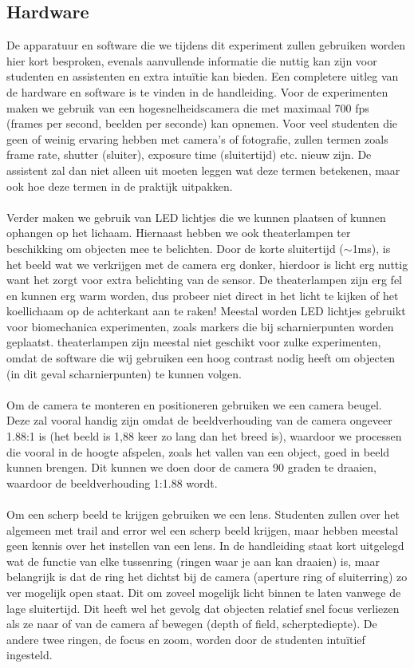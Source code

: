 \documentclass{article}
\begin{document}
\subsection{Hardware}
De apparatuur en software die we tijdens dit experiment zullen gebruiken worden hier kort besproken, evenals aanvullende informatie die nuttig kan zijn voor studenten en assistenten en extra intuïtie kan bieden. Een completere uitleg van de hardware en software is te vinden in de handleiding. Voor de experimenten maken we gebruik van een  hogesnelheidscamera die met maximaal 700 fps (frames per second, beelden per seconde) kan opnemen. Voor veel studenten die geen of weinig ervaring hebben met camera's of fotografie, zullen termen zoals frame rate, shutter (sluiter), exposure time (sluitertijd) etc. nieuw zijn. De assistent zal dan niet alleen uit moeten leggen wat deze termen betekenen, maar ook hoe deze termen in de praktijk uitpakken. \\\\ Verder maken we gebruik van LED lichtjes die we kunnen plaatsen of kunnen ophangen op het lichaam. Hiernaast hebben we ook theaterlampen ter beschikking om objecten mee te belichten. Door de korte sluitertijd ($\sim$1ms), is het beeld wat we verkrijgen met de camera erg donker, hierdoor is licht erg nuttig want het zorgt voor extra belichting van de sensor. De theaterlampen zijn erg fel en kunnen erg warm worden, dus probeer niet direct in het licht te kijken of het koellichaam op de achterkant aan te raken! Meestal worden LED lichtjes gebruikt voor biomechanica experimenten, zoals markers die bij scharnierpunten worden geplaatst. theaterlampen zijn meestal niet geschikt voor zulke experimenten, omdat de software die wij gebruiken een hoog contrast nodig heeft om objecten (in dit geval scharnierpunten) te kunnen volgen. \\\\ Om de camera te monteren en positioneren gebruiken we een camera beugel. Deze zal vooral handig zijn omdat de beeldverhouding van de camera ongeveer 1.88:1 is (het beeld is 1,88 keer zo lang dan het breed is), waardoor we processen die vooral in de hoogte afspelen, zoals het vallen van een object, goed in beeld kunnen brengen. Dit kunnen we doen door de camera 90 graden te draaien, waardoor de beeldverhouding 1:1.88 wordt. \\\\ Om een scherp beeld te krijgen gebruiken we een lens. Studenten zullen over het algemeen met trail and error wel een scherp beeld krijgen, maar hebben meestal geen kennis over het instellen van een lens. In de handleiding staat kort uitgelegd wat de functie van elke tussenring (ringen waar je aan kan draaien) is, maar belangrijk is dat de ring het dichtst bij de camera (aperture ring of sluiterring) zo ver mogelijk open staat. Dit om zoveel mogelijk licht binnen te laten vanwege de lage sluitertijd. Dit heeft wel het gevolg dat objecten relatief snel focus verliezen als ze naar of van de camera af bewegen (depth of field, scherptediepte). De andere twee ringen, de focus en zoom, worden door de studenten intuïtief ingesteld.
\end{document}

